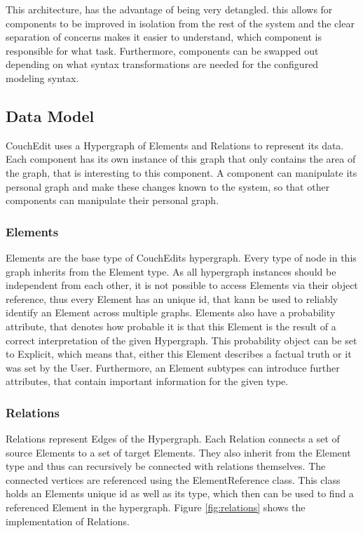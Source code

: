 This architecture, has the advantage of being very detangled. this allows for components to be improved in isolation from the rest of the system and the clear separation of concerns makes it easier to understand, which component is responsible for what task. Furthermore, components can be swapped out depending on what syntax transformations are needed for the configured modeling syntax.



\subsection{Data Model}
CouchEdit uses a Hypergraph of Elements and Relations to represent its data. Each component has its own instance of this graph that only contains the area of the graph, that is interesting to this component. A component can manipulate its personal graph and make these changes known to the system, so that other components can manipulate their personal graph.


\subsubsection{Elements}
Elements are the base type of CouchEdits hypergraph. Every type of node in this graph inherits from the Element type. As all hypergraph instances should be independent from each other, it is not possible to access Elements via their object reference, thus every Element has an unique id, that kann be used to reliably identify an Element across multiple graphs. Elements also have a probability attribute, that denotes how probable it is that this Element is the result of a correct interpretation of the given Hypergraph. This probability object can be set to Explicit, which means that, either this Element describes a factual truth or it was set by the User. Furthermore, an Element subtypes can introduce further attributes, that contain important information for the given type.

\subsubsection{Relations}
Relations represent Edges of the Hypergraph. Each Relation connects a set of source Elements to a set of target Elements. They also inherit from the Element type and thus can recursively be connected with relations themselves. The connected vertices are referenced using the ElementReference class. This class holds an Elements unique id as well as its type, which then can be used to find a referenced Element in the hypergraph. Figure \ref{fig:relations} shows the implementation of Relations. 

